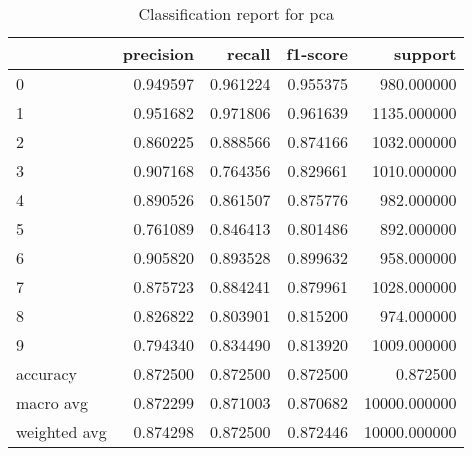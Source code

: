 \begin{table}[htb!]
\centering
\caption{Classification report for pca}
\label{tab:classification-report-pca}
\begin{tabular}{lrrrr}
\toprule
 & precision & recall & f1-score & support \\
\midrule
0 & 0.949597 & 0.961224 & 0.955375 & 980.000000 \\
1 & 0.951682 & 0.971806 & 0.961639 & 1135.000000 \\
2 & 0.860225 & 0.888566 & 0.874166 & 1032.000000 \\
3 & 0.907168 & 0.764356 & 0.829661 & 1010.000000 \\
4 & 0.890526 & 0.861507 & 0.875776 & 982.000000 \\
5 & 0.761089 & 0.846413 & 0.801486 & 892.000000 \\
6 & 0.905820 & 0.893528 & 0.899632 & 958.000000 \\
7 & 0.875723 & 0.884241 & 0.879961 & 1028.000000 \\
8 & 0.826822 & 0.803901 & 0.815200 & 974.000000 \\
9 & 0.794340 & 0.834490 & 0.813920 & 1009.000000 \\
accuracy & 0.872500 & 0.872500 & 0.872500 & 0.872500 \\
macro avg & 0.872299 & 0.871003 & 0.870682 & 10000.000000 \\
weighted avg & 0.874298 & 0.872500 & 0.872446 & 10000.000000 \\
\bottomrule
\end{tabular}
\end{table}
